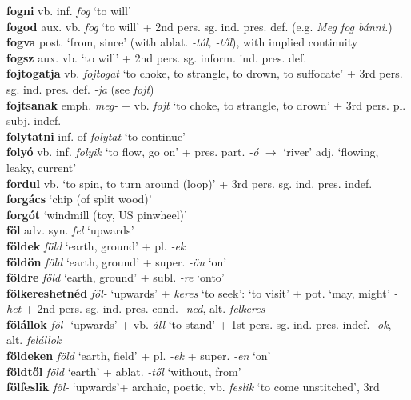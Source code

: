 \documentclass[11pt]{article}
\begin{document}
\textbf{fogni} vb. inf. \emph{fog} `to will' \\
\textbf{fogod} aux. vb. \emph{fog} `to will' + 2nd
pers. sg. ind. pres. def. (e.g. \emph{Meg fog bánni.}) \\
\textbf{fogva} post. `from, since' (with ablat. \emph{-tól, -től}),
with implied continuity \\
\textbf{fogsz} aux. vb. `to will' + 2nd
pers. sg. inform. ind. pres. def. \\
\textbf{fojtogatja} vb. \emph{fojtogat} `to
choke, to strangle, to drown, to suffocate' + 3rd
pers. sg. ind. pres. def. \emph{-ja} (see \emph{fojt}) \\
\textbf{fojtsanak} emph. \emph{meg-} + vb. \emph{fojt} `to
choke, to strangle, to drown' + 3rd pers. pl. subj. indef. \\
\textbf{folytatni} inf. of \emph{folytat} `to continue' \\
\textbf{folyó} vb. inf. \emph{folyik} `to flow, go on' +
pres. part. \emph{-ó} $\rightarrow$ `river' \textbar\textbar{}
adj. `flowing, leaky, current' \\
\textbf{fordul} vb. `to spin, to turn around (loop)' + 3rd
pers. sg. ind. pres. indef. \\
\textbf{forgács} `chip (of split wood)' \\
\textbf{forgót} `windmill (toy, US pinwheel)' \\
\textbf{föl} adv. syn. \emph{fel} `upwards' \\
\textbf{földek} \emph{föld} `earth, ground' + pl. \emph{-ek} \\
\textbf{földön} \emph{föld} `earth, ground' +
super. \emph{-ön} `on' \\
\textbf{földre} \emph{föld} `earth, ground' + subl. \emph{-re}
`onto' \\
\textbf{fölkereshetnéd} \emph{föl-} `upwards' + \emph{keres} `to
seek': `to visit' + pot. `may, might' \emph{-het} + 2nd
pers. sg. ind. pres. cond. \emph{-ned}, alt. \emph{felkeres} \\
\textbf{fölállok} \emph{föl-} `upwards' + vb. \emph{áll} `to stand' + 1st
  pers. sg. ind. pres. indef. \emph{-ok}, alt. \emph{felállok} \\
\textbf{földeken} \emph{föld} `earth, field' + pl. \emph{-ek} +
super. \emph{-en} `on' \\
\textbf{földtől} \emph{föld} `earth' + ablat. \emph{-től} `without,
from' \\
\textbf{fölfeslik} \emph{föl-} `upwards'+ archaic, poetic,
vb. \emph{feslik} `to come unstitched', 3rd
\end{document}
